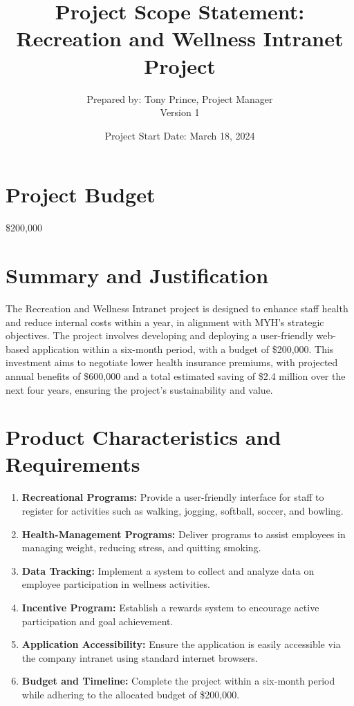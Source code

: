 \documentclass{article}
\title{Project Scope Statement: Recreation and Wellness Intranet Project}
\author{Prepared by: Tony Prince, Project Manager \\ Version 1}
\date{Project Start Date: March 18, 2024}
\begin{document}
\maketitle

\section*{Project Budget}
\$200,000

\section*{Summary and Justification}
The Recreation and Wellness Intranet project is designed to enhance staff health and reduce internal costs within a year, in alignment with MYH's strategic objectives. The project involves developing and deploying a user-friendly web-based application within a six-month period, with a budget of \$200,000. This investment aims to negotiate lower health insurance premiums, with projected annual benefits of \$600,000 and a total estimated saving of \$2.4 million over the next four years, ensuring the project's sustainability and value.

\section*{Product Characteristics and Requirements}
\begin{enumerate}[label=\arabic*.]
    \item \textbf{Recreational Programs:} Provide a user-friendly interface for staff to register for activities such as walking, jogging, softball, soccer, and bowling.
    \item \textbf{Health-Management Programs:} Deliver programs to assist employees in managing weight, reducing stress, and quitting smoking.
    \item \textbf{Data Tracking:} Implement a system to collect and analyze data on employee participation in wellness activities.
    \item \textbf{Incentive Program:} Establish a rewards system to encourage active participation and goal achievement.
    \item \textbf{Application Accessibility:} Ensure the application is easily accessible via the company intranet using standard internet browsers.
    \item \textbf{Budget and Timeline:} Complete the project within a six-month period while adhering to the allocated budget of \$200,000.
\end{enumerate}
\end{document}
